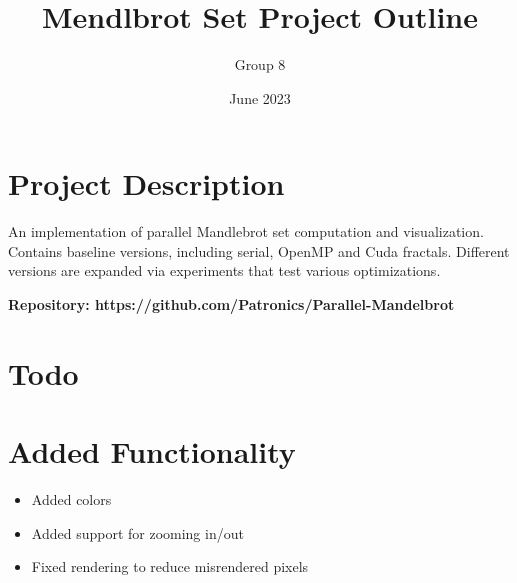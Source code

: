 \documentclass{article}
\title{Mendlbrot Set Project Outline}
\author{Group 8}
\date{June 2023}
\begin{document}
\maketitle

\section*{Project Description}

An implementation of parallel Mandlebrot set computation and visualization. Contains baseline versions, including serial, OpenMP and Cuda fractals. Different versions are expanded via experiments that test various 
optimizations. 

\textbf{Repository: https://github.com/Patronics/Parallel-Mandelbrot}

\section*{Todo}

\section*{Added Functionality}
\begin{itemize}
    \item Added colors
    \item Added support for zooming in/out
    \item Fixed rendering to reduce misrendered pixels
\end{itemize}
\end{document}
